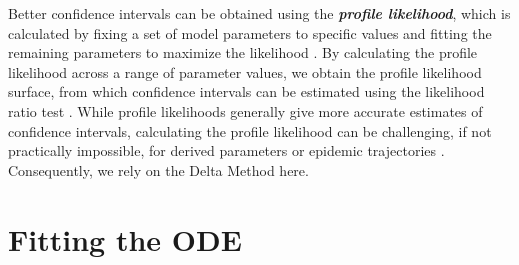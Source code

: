 \documentclass[]{interact}\usepackage[]{graphicx}\usepackage[]{xcolor}
\theoremstyle{plain}%
\theoremstyle{definition}
\theoremstyle{remark}
\newcommand{\term}[1]{{\bfseries\slshape#1}}
\begin{document}
Better confidence intervals can be obtained using the \term{profile
  likelihood}, which is calculated by fixing a set of model parameters
to specific values and fitting the remaining parameters to maximize
the likelihood \citep[\S 7.5.1]{Bolk08}.  By calculating the profile
likelihood across a range of parameter values, we obtain the profile
likelihood surface, from which confidence intervals can be estimated
using the likelihood ratio test \citep[\S 6.4.1.1]{Bolk08}.  While
profile likelihoods generally give more accurate estimates of
confidence intervals, calculating the profile likelihood can be
challenging, if not practically impossible, for derived parameters or
epidemic trajectories \cite[\S 7.5.1.2]{Bolk08}.  Consequently, we
rely on the Delta Method here.

\section{Fitting the ODE}\label{sec:fitode}
\end{document}
